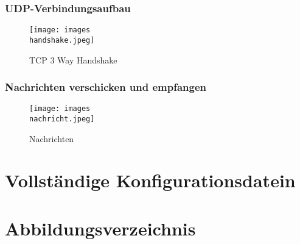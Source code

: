 \documentclass[a4paper]{article}
\begin{document}
\subsubsection{UDP-Verbindungsaufbau}
\begin{figure}[h]
	\texttt{[image: images\\handshake.jpeg]}
	\caption{TCP 3 Way Handshake}
\end{figure}
\subsubsection{Nachrichten verschicken und empfangen}
\begin{figure}[h]
	\texttt{[image: images\\nachricht.jpeg]}
	\caption{Nachrichten}
\end{figure}
\newpage

\section{Vollständige Konfigurationsdatein}

\newpage

\section{Abbildungsverzeichnis}

\listoffigures
\end{document}
